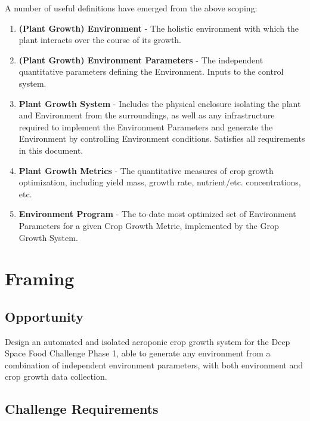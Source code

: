 \documentclass{report}
\begin{document}
A number of useful definitions have emerged from the above scoping:
\begin{enumerate}
\item \textbf{(Plant Growth) Environment} - The holistic environment with which the plant interacts over the course of its growth.
\item \textbf{(Plant Growth) Environment Parameters} - The independent quantitative parameters defining the Environment. Inputs to the control system.
\item \textbf{Plant Growth System} - Includes the physical enclosure isolating the plant and Environment from the surroundings, as well as any infrastructure required to implement the Environment Parameters and generate the Environment by controlling Environment conditions. Satisfies all requirements in this document.
\item \textbf{Plant Growth Metrics} - The quantitative measures of crop growth optimization, including yield mass, growth rate, nutrient/etc. concentrations, etc.
\item \textbf{Environment Program} - The to-date most optimized set of Environment Parameters for a given Crop Growth Metric, implemented by the Grop Growth System.
\end{enumerate}

\newpage
\section{Framing}
\label{sec:framing}

\subsection{Opportunity}
\label{sec:opportunity}

Design an automated and isolated aeroponic crop growth system for the Deep Space Food Challenge Phase 1\cite{dsfc}, able to generate any environment from a combination of independent environment parameters, with both environment and crop growth data collection.

\subsection{Challenge Requirements}
\label{sec:requirements}
\end{document}
